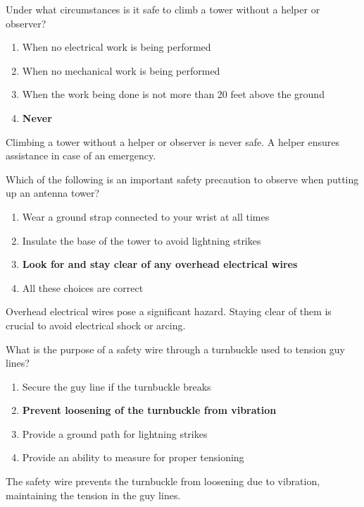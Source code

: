 
\begin{tcolorbox}[colback=gray!10!white,colframe=black!75!black,title={T0B03}]
Under what circumstances is it safe to climb a tower without a helper or observer?
\begin{enumerate}[label=\Alph*),noitemsep]
    \item When no electrical work is being performed
    \item When no mechanical work is being performed
    \item When the work being done is not more than 20 feet above the ground
    \item \textbf{Never}
\end{enumerate}
\end{tcolorbox}
Climbing a tower without a helper or observer is never safe. A helper ensures assistance in case of an emergency.


\begin{tcolorbox}[colback=gray!10!white,colframe=black!75!black,title={T0B04}]
Which of the following is an important safety precaution to observe when putting up an antenna tower?
\begin{enumerate}[label=\Alph*),noitemsep]
    \item Wear a ground strap connected to your wrist at all times
    \item Insulate the base of the tower to avoid lightning strikes
    \item \textbf{Look for and stay clear of any overhead electrical wires}
    \item All these choices are correct
\end{enumerate}
\end{tcolorbox}
Overhead electrical wires pose a significant hazard. Staying clear of them is crucial to avoid electrical shock or arcing.


\begin{tcolorbox}[colback=gray!10!white,colframe=black!75!black,title={T0B05}]
What is the purpose of a safety wire through a turnbuckle used to tension guy lines?
\begin{enumerate}[label=\Alph*),noitemsep]
    \item Secure the guy line if the turnbuckle breaks
    \item \textbf{Prevent loosening of the turnbuckle from vibration}
    \item Provide a ground path for lightning strikes
    \item Provide an ability to measure for proper tensioning
\end{enumerate}
\end{tcolorbox}
The safety wire prevents the turnbuckle from loosening due to vibration, maintaining the tension in the guy lines.

